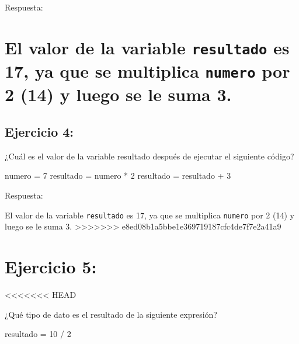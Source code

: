 \documentclass[
  a4paper,
  DIV=11,
  numbers=noendperiod,
  onepage,
  openany]{scrreprt}
\newenvironment{Shaded}{\begin{snugshade}}{\end{snugshade}}
\newcommand{\DecValTok}[1]{\textcolor[rgb]{0.68,0.00,0.00}{#1}}
\newcommand{\NormalTok}[1]{\textcolor[rgb]{0.00,0.23,0.31}{#1}}
\newcommand{\OperatorTok}[1]{\textcolor[rgb]{0.37,0.37,0.37}{#1}}
\begin{document}
Respuesta:

\hypertarget{el-valor-de-la-variable-resultado-es-17-ya-que-se-multiplica-numero-por-2-14-y-luego-se-le-suma-3.}{%
\chapter{\texorpdfstring{El valor de la variable \texttt{resultado} es
17, ya que se multiplica \texttt{numero} por 2 (14) y luego se le suma
3.}{El valor de la variable resultado es 17, ya que se multiplica numero por 2 (14) y luego se le suma 3.}}\label{el-valor-de-la-variable-resultado-es-17-ya-que-se-multiplica-numero-por-2-14-y-luego-se-le-suma-3.}}

\hypertarget{ejercicio-4-1}{%
\section{Ejercicio 4:}\label{ejercicio-4-1}}

¿Cuál es el valor de la variable resultado después de ejecutar el
siguiente código?

\begin{Shaded}
\begin{Highlighting}[]
\NormalTok{numero }\OperatorTok{=} \DecValTok{7}
\NormalTok{resultado }\OperatorTok{=}\NormalTok{ numero }\OperatorTok{*} \DecValTok{2}
\NormalTok{resultado }\OperatorTok{=}\NormalTok{ resultado }\OperatorTok{+} \DecValTok{3}
\end{Highlighting}
\end{Shaded}

Respuesta:

El valor de la variable \texttt{resultado} es 17, ya que se multiplica
\texttt{numero} por 2 (14) y luego se le suma 3.
\textgreater\textgreater\textgreater\textgreater\textgreater\textgreater\textgreater{}
e8ed08b1a5bbe1e369719187cfc4de7f7e2a41a9

\hypertarget{ejercicio-5}{%
\chapter{Ejercicio 5:}\label{ejercicio-5}}

\textless\textless\textless\textless\textless\textless\textless{} HEAD

¿Qué tipo de dato es el resultado de la siguiente expresión?

\begin{Shaded}
\begin{Highlighting}[]
\NormalTok{resultado }\OperatorTok{=} \DecValTok{10} \OperatorTok{/} \DecValTok{2}
\end{Highlighting}
\end{Shaded}
\end{document}
